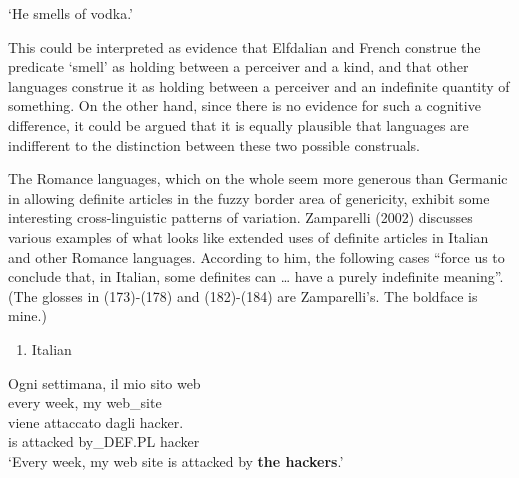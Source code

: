 ‘He smells of vodka.’
\z


This could be interpreted as evidence that Elfdalian and French construe the predicate ‘smell’ as holding between a perceiver and a kind, and that other languages construe it as holding between a perceiver and an indefinite quantity of something. On the other hand, since there is no evidence for such a cognitive difference, it could be argued that it is equally plausible that languages are indifferent to the distinction between these two possible construals. 

The Romance languages, which on the whole seem more generous than Germanic in allowing definite articles in the fuzzy border area of genericity, exhibit some interesting cross-linguistic patterns of variation. Zamparelli (2002) discusses various examples of what looks like extended uses of definite articles in Italian and other Romance languages. According to him, the following cases “force us to conclude that, in Italian, some definites can … have a purely indefinite meaning”. (The glosses in (173){}-(178) and (182){}-(184) are Zamparelli’s. The boldface is mine.)

\begin{enumerate} %
\item 
\label{bkm:Ref172696600}\label{bkm:Ref69030048}Italian

\end{enumerate} %
\ea\label{}
\gll Ogni  settimana,  il mio  sito web\\


every  week,  my  web\_site\\ %


\ea\label{}
\gll viene  attaccato  dagli  hacker.\\


is  attacked  by\_DEF.PL  hacker\\ %


‘Every week, my web site is attacked by \textbf{the hackers}.’
\z

